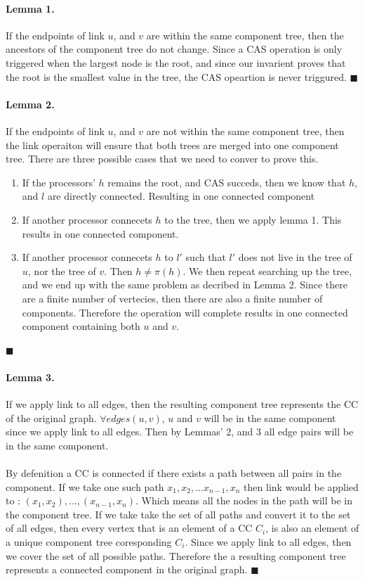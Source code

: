 \documentclass[]{article}
\newcommand*{\QEDA}{\hfill\ensuremath{\blacksquare}}%
\begin{document}
 \paragraph{Lemma 1.}
 If the endpoints of link $u$, and $v$ are within the same component tree, then the ancestors of the component tree do not change. Since a CAS operation is only triggered when the largest node is the root, and since our invarient proves that the root is the smallest value in the tree, the CAS opeartion is never triggured.
\QEDA 
\paragraph{Lemma 2.}
If the endpoints of link $u$, and $v$ are not within the same component tree, then the link operaiton will ensure that both trees are merged into one component tree. There are three possible cases that we need to conver to prove this.

\begin{enumerate}
  \item If the processors' $h$ remains the root, and CAS succeds, then we know that $h$, and $l$ are directly connected. Resulting in one connected component
  \item If another processor connecets $h$ to the tree, then we apply lemma 1. This results in one connected component.
  \item If another processor connecets $h$ to $l'$ such that $l'$ does not live in the tree of $u$, nor the tree of $v$. Then $h \neq \pi(h)$. We then repeat searching up the tree, and we end up with the same problem as decribed in Lemma 2. Since there are a finite number of vertecies, then there are also a finite number of components. Therefore the operation will complete results in one connected component containing both $u$ and $v$.
\end{enumerate}
\QEDA
\paragraph{Lemma 3.}
If we apply link to all edges, then the resulting component tree represents the CC of the original graph. $\forall edges(u,v)$, $u$ and $v$ will be in the same component since we apply link to all edges. Then by Lemmas' 2, and 3 all edge pairs will be in the same component.

\paragraph{}
By defenition a CC is connected if there exists a path between all pairs in the component. If we take one such path $x_1,x_2,...x_{n-1},x_n$ then link would be applied to : $(x_1,x_2),...,(x_{n-1},x_n)$. Which means all the nodes in the path will be in the component tree. If we take take the set of all paths and convert it to the set of all edges, then every vertex that is an element of a CC $C_i$, is also an element of a unique component tree coresponding $C_i$. Since we apply link to all edges, then we cover the set of all possible paths. Therefore the a resulting component tree represents a connected component in the original graph.
\QEDA
\end{document}
